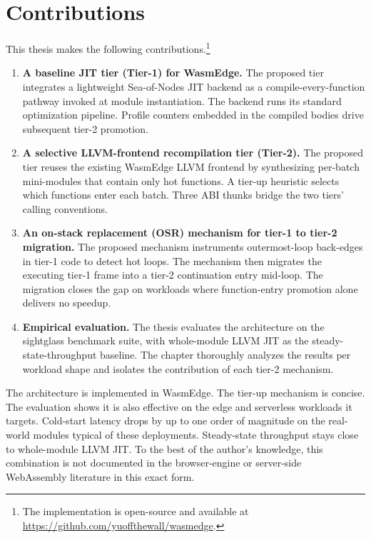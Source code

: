\section{Contributions}
\label{sec:intro:contributions}

This thesis makes the following contributions.\footnote{The implementation is open-source and available at \url{https://github.com/yuoffthewall/wasmedge}.}

\begin{enumerate}
  \item \textbf{A baseline JIT tier (Tier-1) for WasmEdge.} The proposed tier integrates a lightweight Sea-of-Nodes JIT backend as a compile-every-function pathway invoked at module instantiation. The backend runs its standard optimization pipeline. Profile counters embedded in the compiled bodies drive subsequent tier-2 promotion.

  \item \textbf{A selective LLVM-frontend recompilation tier (Tier-2).} The proposed tier reuses the existing WasmEdge LLVM frontend by synthesizing per-batch mini-modules that contain only hot functions. A tier-up heuristic selects which functions enter each batch. Three ABI thunks bridge the two tiers' calling conventions.

  \item \textbf{An on-stack replacement (OSR) mechanism for tier-1 to tier-2 migration.} The proposed mechanism instruments outermost-loop back-edges in tier-1 code to detect hot loops. The mechanism then migrates the executing tier-1 frame into a tier-2 continuation entry mid-loop. The migration closes the gap on workloads where function-entry promotion alone delivers no speedup.

  \item \textbf{Empirical evaluation.} The thesis evaluates the architecture on the sightglass benchmark suite, with whole-module LLVM JIT as the steady-state-throughput baseline. The chapter thoroughly analyzes the results per workload shape and isolates the contribution of each tier-2 mechanism.
\end{enumerate}

The architecture is implemented in WasmEdge. The tier-up mechanism is concise. The evaluation shows it is also effective on the edge and serverless workloads it targets. Cold-start latency drops by up to one order of magnitude on the real-world modules typical of these deployments. Steady-state throughput stays close to whole-module LLVM JIT. To the best of the author's knowledge, this combination is not documented in the browser-engine or server-side WebAssembly literature in this exact form.

